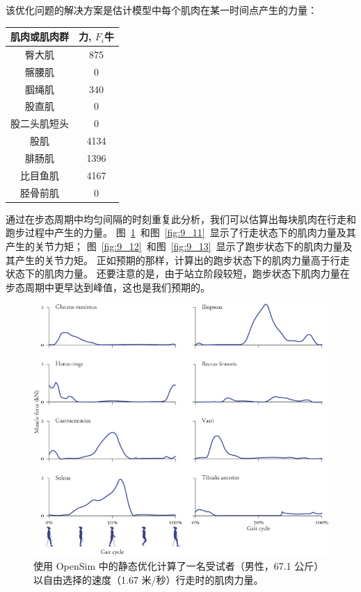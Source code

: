 该优化问题的解决方案是估计模型中每个肌肉在某一时间点产生的力量：

\begin{table}[htbp]
	\label{tab:9_1} \centering
	\begin{tabular}{cc} %
		\toprule
		肌肉或肌肉群 & 力, $F_i$牛  \\
		\midrule
		臀大肌 & 875  \\
		\midrule
		髂腰肌 & 0  \\
		\midrule
		腘绳肌 & 340  \\
		\midrule
		股直肌 & 0  \\
		\midrule
		股二头肌短头 & 0  \\
		\midrule
		股肌 & 4134  \\
		\midrule
		腓肠肌 & 1396  \\
		\midrule
		比目鱼肌 & 4167  \\
		\midrule
		胫骨前肌 & 0  \\
		\bottomrule
	\end{tabular}
\end{table}


通过在步态周期中均匀间隔的时刻重复此分析，我们可以估算出每块肌肉在行走和跑步过程中产生的力量。
图~\ref{fig:9_10}~和图~\ref{fig:9_11}~显示了行走状态下的肌肉力量及其产生的关节力矩；
图~\ref{fig:9_12}~和图~\ref{fig:9_13}~显示了跑步状态下的肌肉力量及其产生的关节力矩。
正如预期的那样，计算出的跑步状态下的肌肉力量高于行走状态下的肌肉力量。
还要注意的是，由于站立阶段较短，跑步状态下肌肉力量在步态周期中更早达到峰值，这也是我们预期的。


\begin{figure}[!htb]
	\centering
	\includegraphics[width=1.0\linewidth]{chap9/9_10}
	\caption{使用 OpenSim 中的静态优化计算了一名受试者（男性，67.1 公斤）以自由选择的速度（1.67 米/秒）行走时的肌肉力量\cite{dembia2017simulating}。 \label{fig:9_10}}
\end{figure}


